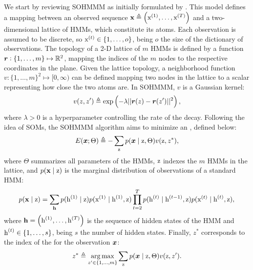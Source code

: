 We start by reviewing SOHMMM as initially formulated by \citet{Ferles2008}. This model defines a mapping between an observed sequence ${\mathbf{x}} \triangleq \left({\textnormal{x}}^{(1)}, \dots, {\textnormal{x}}^{(T)} \right)$ and a two-dimensional lattice of HMMs, which constitute its atoms. Each observation is assumed to be discrete, so ${\textnormal{x}}^{(t)} \in \{1,\dots,o\}$, being $o$ the size of the dictionary of observations. The topology of a 2-D lattice of $m$ HMMs is defined by a function ${\bm{r}}: \{1, \dots, m\} \mapsto \mathbb{R}^2$, mapping the indices of the $m$ nodes to the respective coordinates in the plane. Given the lattice topology, a neighborhood function $v: \{1, \dots, m\}^2 \mapsto [0, \infty)$ can be defined mapping two nodes in the lattice to a scalar representing how close the two atoms are. In SOHMMM, $v$ is a Gaussian kernel:
\begin{equation}
    \label{eq:sohmmm_distance}
    v(z,z') \triangleq \exp\left(-\lambda||{\bm{r}}(z)-{\bm{r}}(z')||^{2}\right),
\end{equation}
where $\lambda > 0$ is a hyperparameter controlling the rate of the decay.
Following the idea of SOMs, the SOHMMM algorithm aims to minimize an , defined below:
\begin{equation}
    \label{eq:sohmmm_energy}
    E({\bm{x}}; \Theta) \triangleq -\sum_{{\textnormal{z}}} p({\bm{x}} \mid {\textnormal{z}}, \Theta)v({\textnormal{z}}, z^*),
\end{equation}
where $\Theta$ summarizes all parameters of the HMMs, ${\textnormal{z}}$ indexes the $m$ HMMs in the lattice, and $p({\mathbf{x}} \mid {\textnormal{z}})$ is the marginal distribution of observations of a standard HMM:
\begin{equation}
    \label{eq:sohmmm_hmm}
    p({\mathbf{x}} \mid {\textnormal{z}}) = \sum_{{\mathbf{h}}} p({\textnormal{h}}^{(1)} \mid {\textnormal{z}}) p({\textnormal{x}}^{(1)} \mid {\textnormal{h}}^{(1)},{\textnormal{z}}) \prod_{t=2}^T p({\textnormal{h}}^{(t)} \mid {\textnormal{h}}^{(t-1)},{\textnormal{z}}) p({\textnormal{x}}^{(t)} \mid {\textnormal{h}}^{(t)},{\textnormal{z}}),
\end{equation}
where ${\mathbf{h}} = \left({\textnormal{h}}^{(1)},\dots,{\textnormal{h}}^{(T)}\right)$ is the sequence of hidden states of the HMM and ${\textnormal{h}}^{(t)} \in \{1, \dots, s\}$, being $s$ the number of hidden states. Finally, $z^*$ corresponds to the index of the  for the observation ${\bm{x}}$:
\begin{equation}
    \label{eq:sohmmm_winner}
    z^* \triangleq \operatorname*{arg\,max}_{z' \in \{1,\dots,m\}} \sum_{{\textnormal{z}}} p({\bm{x}} \mid {\textnormal{z}}, \Theta)v({\textnormal{z}}, z').
\end{equation}

